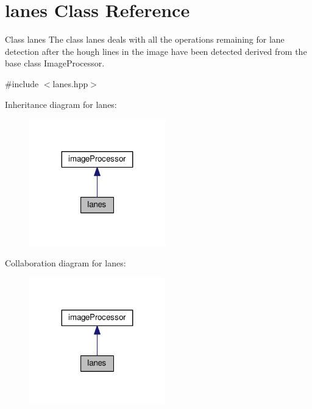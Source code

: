 \hypertarget{classlanes}{}\section{lanes Class Reference}
\label{classlanes}


Class lanes The class lanes deals with all the operations remaining for lane detection after the hough lines in the image have been detected derived from the base class Image\+Processor.  




{\ttfamily \#include $<$lanes.\+hpp$>$}



Inheritance diagram for lanes\+:
\nopagebreak
\begin{figure}[H]
\begin{center}
\leavevmode
\includegraphics[width=167pt]{classlanes__inherit__graph}
\end{center}
\end{figure}


Collaboration diagram for lanes\+:
\nopagebreak
\begin{figure}[H]
\begin{center}
\leavevmode
\includegraphics[width=167pt]{classlanes__coll__graph}
\end{center}
\end{figure}

